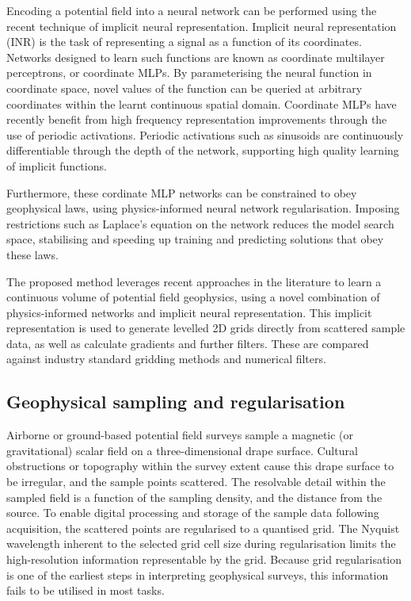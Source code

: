 \documentclass[manuscript.tex]{subfiles}
\begin{document}
Encoding a potential field into a neural network can be performed using the recent technique of implicit neural representation.
Implicit neural representation (INR) is the task of representing a signal as a function of its coordinates.
Networks designed to learn such functions are known as coordinate multilayer perceptrons, or coordinate MLPs.
By parameterising the neural function in coordinate space, novel values of the function can be queried at arbitrary coordinates within the learnt continuous spatial domain.
Coordinate MLPs have recently benefit from high frequency representation improvements through the use of periodic activations.
Periodic activations such as sinusoids are continuously differentiable through the depth of the network, supporting high quality learning of implicit functions.

Furthermore, these cordinate MLP networks can be constrained to obey geophysical laws, using physics-informed neural network regularisation.
Imposing restrictions such as Laplace's equation on the network reduces the model search space, stabilising and speeding up training and predicting solutions that obey these laws.

The proposed method leverages recent approaches in the literature to learn a continuous volume of potential field geophysics, using a novel combination of physics-informed networks and implicit neural representation.
This implicit representation is used to generate levelled 2D grids directly from scattered sample data, as well as calculate gradients and further filters.
These are compared against industry standard gridding methods and numerical filters.

\subsection{Geophysical sampling and regularisation}
\label{sec:geo_airborne}
Airborne or ground-based potential field surveys sample a magnetic (or gravitational) scalar field on a three-dimensional drape surface.
Cultural obstructions or topography within the survey extent cause this drape surface to be irregular, and the sample points scattered.
The resolvable detail within the sampled field is a function of the sampling density, and the distance from the source.
To enable digital processing and storage of the sample data following acquisition, the scattered points are regularised to a quantised grid.
The Nyquist wavelength inherent to the selected grid cell size during regularisation limits the high-resolution information representable by the grid.
Because grid regularisation is one of the earliest steps in interpreting geophysical surveys, this information fails to be utilised in most tasks.
\end{document}

